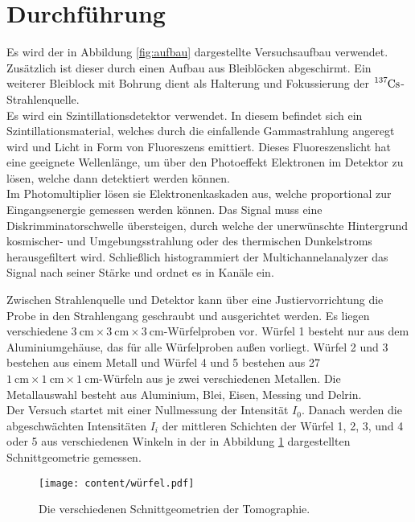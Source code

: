 \section{Durchführung}
\label{sec:Durchführung}

Es wird der in Abbildung \ref{fig:aufbau} dargestellte Versuchsaufbau verwendet. Zusätzlich
ist dieser durch einen Aufbau aus Bleiblöcken abgeschirmt. Ein weiterer Bleiblock mit Bohrung
dient als Halterung und Fokussierung der $\ce{^{137}Cs}$-Strahlenquelle.\\

Es wird ein Szintillationsdetektor verwendet. In diesem befindet sich ein Szintillationsmaterial, welches
durch die einfallende Gammastrahlung angeregt wird und Licht in Form von Fluoreszens emittiert.
Dieses Fluoreszenslicht hat eine geeignete Wellenlänge, um über den Photoeffekt Elektronen
im Detektor zu lösen, welche dann detektiert werden können. \\

Im Photomultiplier lösen sie Elektronenkaskaden aus, welche proportional zur
Eingangsenergie gemessen werden können. Das Signal muss eine Diskrimminatorschwelle übersteigen, durch welche
der unerwünschte Hintergrund kosmischer- und Umgebungsstrahlung oder des thermischen Dunkelstroms herausgefiltert wird.
Schließlich histogrammiert der Multichannelanalyzer das Signal nach seiner Stärke und ordnet es in Kanäle ein.



Zwischen Strahlenquelle und Detektor kann über eine Justiervorrichtung die Probe in den Strahlengang geschraubt 
und ausgerichtet werden. Es liegen verschiedene 
$\SI{3}{\centi\meter} \times \SI{3}{\centi\meter} \times \SI{3}{\centi\meter}$-Würfelproben vor.
Würfel 1 besteht nur aus dem Aluminiumgehäuse, das für alle Würfelproben außen vorliegt.
Würfel 2 und 3 bestehen aus einem Metall und Würfel 4 und 5 bestehen aus 27 
$\SI{1}{\centi\meter} \times \SI{1}{\centi\meter} \times \SI{1}{\centi\meter}$-Würfeln aus je zwei verschiedenen Metallen.
Die Metallauswahl besteht aus Aluminium, Blei, Eisen, Messing und Delrin.\\

Der Versuch startet mit einer Nullmessung der Intensität $I_0$. Danach werden die abgeschwächten Intensitäten $I_i$
der mittleren Schichten der Würfel 1, 2, 3, und 4 oder 5 aus verschiedenen Winkeln in der in Abbildung \ref{fig:würfel}
dargestellten Schnittgeometrie gemessen.

\vspace{-5pt}
\begin{figure}[H]
    \centering
    \texttt{[image: content/würfel.pdf]}
    \vspace{-5pt}
    \caption{Die verschiedenen Schnittgeometrien der Tomographie.}
    \label{fig:würfel}
\end{figure}
\vspace{-5pt}

